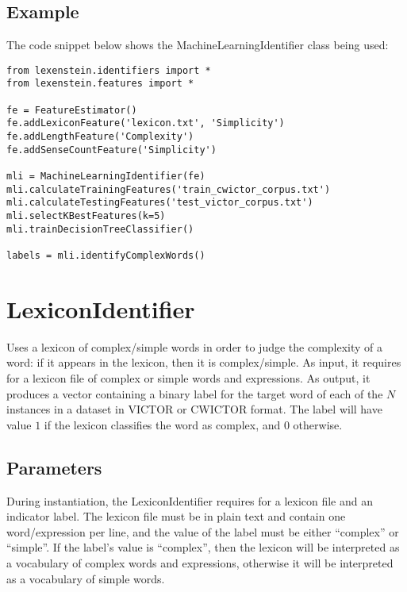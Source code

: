 \subsection{Example}

The code snippet below shows the MachineLearningIdentifier class being used:

\begin{lstlisting}
from lexenstein.identifiers import *
from lexenstein.features import *

fe = FeatureEstimator()
fe.addLexiconFeature('lexicon.txt', 'Simplicity')
fe.addLengthFeature('Complexity')
fe.addSenseCountFeature('Simplicity')

mli = MachineLearningIdentifier(fe)
mli.calculateTrainingFeatures('train_cwictor_corpus.txt')
mli.calculateTestingFeatures('test_victor_corpus.txt')
mli.selectKBestFeatures(k=5)
mli.trainDecisionTreeClassifier()

labels = mli.identifyComplexWords()
\end{lstlisting}





\section{LexiconIdentifier}

Uses a lexicon of complex/simple words in order to judge the complexity of a word: if it appears in the lexicon, then it is complex/simple. As input, it requires for a lexicon file of complex or simple words and expressions. As output, it produces a vector containing a binary label for the target word of each of the $N$ instances in a dataset in VICTOR or CWICTOR format. The label will have value $1$ if the lexicon classifies the word as complex, and $0$ otherwise.

\subsection{Parameters}

During instantiation, the LexiconIdentifier requires for a lexicon file and an indicator label. The lexicon file must be in plain text and contain one word/expression per line, and the value of the label must be either ``complex'' or ``simple''. If the label's value is ``complex'', then the lexicon will be interpreted as a vocabulary of complex words and expressions, otherwise it will be interpreted as a vocabulary of simple words.

